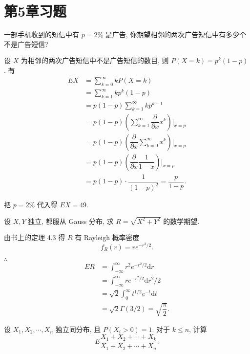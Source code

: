 \documentclass{ctexart}
\begin{document}
\section{第5章习题}
\addtocounter{exsection}{5}
\addtocounter{exercise}{4}
\begin{exercise}%
    一部手机收到的短信中有 $p=2\%$ 是广告, 你期望相邻的两次广告短信中有多少个不是广告短信?
\end{exercise}
\begin{solution}
    设 $X$ 为相邻的两次广告短信中不是广告短信的数目, 则 $P(X=k)=p^k(1-p)$. 有
    \begin{align*}
        EX & =\sum\limits_{k=0}^\infty kP(X=k) \\
        & =\sum\limits_{k=1}^\infty kp^k(1-p) \\
        & =p(1-p)\sum\limits_{k=1}^\infty kp^{k-1} \\
        & =p(1-p)\left(\sum\limits_{k=1}^\infty\dfrac{\partial}{\partial x}x^k\right)\Bigg|_{x=p} \\
        & =p(1-p)\left(\dfrac{\partial}{\partial x}\sum\limits_{k=0}^\infty x^k\right)\Bigg|_{x=p} \\
        & =p(1-p)\left(\dfrac{\partial}{\partial x}\dfrac{1}{1-x}\right)\Bigg|_{x=p} \\
        & =p(1-p)\cdot\dfrac{1}{(1-p)^2}=\dfrac{p}{1-p}.
    \end{align*}

    把 $p=2\%$ 代入得 $EX=49$.
\end{solution}
\addtocounter{exercise}{2}
\begin{exercise}%
    设 $X,Y$ 独立, 都服从 Gauss 分布, 求 $R=\sqrt{X^2+Y^2}$ 的数学期望.
\end{exercise}
\begin{solution}
    由书上的定理 4.3 得 $R$ 有 Rayleigh 概率密度
    \[f_R(r)=re^{-r^2/2}.\]

    $\therefore$
    \begin{align*}
        ER & =\int_{-\infty}^\infty r^2e^{-r^2/2}\mathrm{d}r \\
        & =\int_{-\infty}^\infty re^{-r^2/2}\mathrm{d}r^2/2 \\
        & =\sqrt{2}\int_0^\infty t^{1/2}e^{-t}\mathrm{d}t \\
        & =\sqrt{2}\Gamma(3/2)=\sqrt{\dfrac{\pi}{2}}.
    \end{align*}
\end{solution}
\begin{exercise}%
    设 $X_1,X_2,\cdots,X_n$ 独立同分布, 且 $P(X_i>0)=1$. 对于 $k\leq n$, 计算
    \[E\dfrac{X_1+X_2+\cdots+X_k}{X_1+X_2+\cdots+X_n}.\]
\end{exercise}
\end{document}
